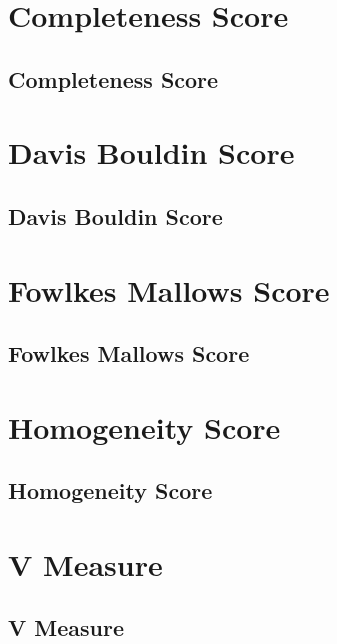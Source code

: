 \clearpage
\thispagestyle{clusteringstyle}
\section{Completeness Score}
\subsection{Completeness Score}

\clearpage
\thispagestyle{clusteringstyle}
\section{Davis Bouldin Score}
\subsection{Davis Bouldin Score}

\clearpage
\thispagestyle{clusteringstyle}
\section{Fowlkes Mallows Score}
\subsection{Fowlkes Mallows Score}

\clearpage
\thispagestyle{clusteringstyle}
\section{Homogeneity Score}
\subsection{Homogeneity Score}

\clearpage
\thispagestyle{clusteringstyle}
\section{V Measure}
\subsection{V Measure}

\clearpage
\thispagestyle{clusteringstyle}

